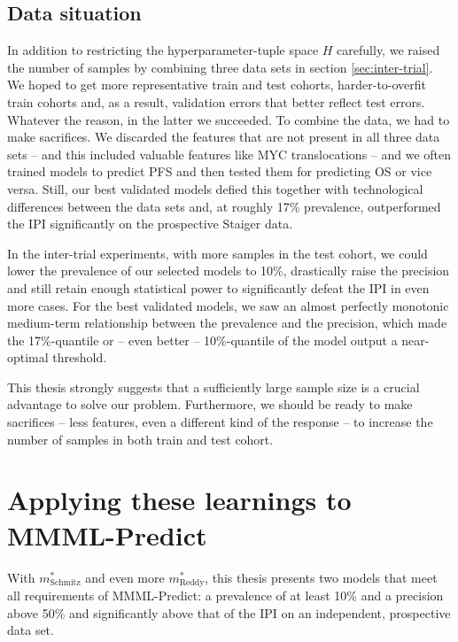 \subsection{Data situation}\label{subsec:discussion-data}

In addition to restricting the hyperparameter-tuple space $H$ carefully, we raised the number of 
samples by combining three data sets in section \ref{sec:inter-trial}. We hoped to get more representative train and 
test cohorts, harder-to-overfit train cohorts and, as a result, validation errors that better 
reflect test errors. Whatever the reason, in the latter we succeeded. To combine the data, we had to 
make sacrifices. We discarded the features that are not present in all three data sets -- and this 
included valuable features like MYC translocations -- and we often trained models to predict PFS 
and then tested them for predicting OS or vice versa. Still, our best validated models defied this together 
with technological differences between the data sets and, at roughly \num{17}\% prevalence, 
outperformed the IPI significantly on the prospective Staiger data.

In the inter-trial experiments, with more samples in the test cohort, we could lower the prevalence 
of our selected models to \num{10}\%, drastically raise the precision and still retain enough 
statistical power to significantly defeat the IPI in even more cases. For the best validated models, 
we saw an almost perfectly monotonic medium-term relationship between the prevalence 
and the precision, which made the \num{17}\%-quantile or -- even better -- \num{10}\%-quantile of 
the model output a near-optimal threshold. 

This thesis strongly suggests that a sufficiently large sample size is a crucial advantage to solve 
our problem. Furthermore, we should be ready to make sacrifices -- less features, 
even a different kind of the response -- to increase the number of samples in both train and test 
cohort. 

\section{Applying these learnings to MMML-Predict}\label{subsec:discussion-mmml}

With $m^*_\text{Schmitz}$ and even more $m^*_\text{Reddy}$, this thesis presents two 
models that meet all requirements of MMML-Predict: a prevalence of at least \num{10}\% and a 
precision above \num{50}\% and significantly above that of the IPI on an independent, prospective 
data set. 

